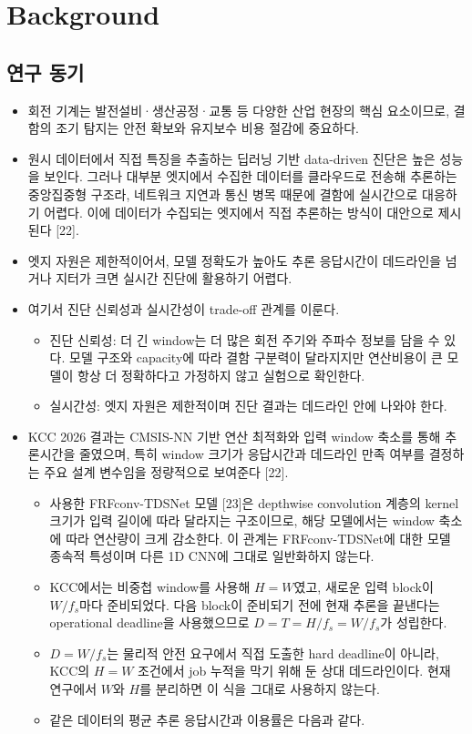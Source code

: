 \documentclass[10pt]{article}
\begin{document}
\section{Background}
\subsection{연구 동기}
\begin{itemize}
\item 회전 기계는 발전설비·생산공정·교통 등 다양한 산업 현장의 핵심 요소이므로, 결함의 조기 탐지는 안전 확보와 유지보수 비용 절감에 중요하다.
\item 원시 데이터에서 직접 특징을 추출하는 딥러닝 기반 data-driven 진단은 높은 성능을 보인다. 그러나 대부분 엣지에서 수집한 데이터를 클라우드로 전송해 추론하는 중앙집중형 구조라, 네트워크 지연과 통신 병목 때문에 결함에 실시간으로 대응하기 어렵다. 이에 데이터가 수집되는 엣지에서 직접 추론하는 방식이 대안으로 제시된다 [22].
\item 엣지 자원은 제한적이어서, 모델 정확도가 높아도 추론 응답시간이 데드라인을 넘거나 지터가 크면 실시간 진단에 활용하기 어렵다.
\item 여기서 진단 신뢰성과 실시간성이 trade-off 관계를 이룬다.
\begin{itemize}
\item 진단 신뢰성: 더 긴 window는 더 많은 회전 주기와 주파수 정보를 담을 수 있다. 모델 구조와 capacity에 따라 결함 구분력이 달라지지만 연산비용이 큰 모델이 항상 더 정확하다고 가정하지 않고 실험으로 확인한다.
\item 실시간성: 엣지 자원은 제한적이며 진단 결과는 데드라인 안에 나와야 한다.
\end{itemize}
\item KCC 2026 결과는 CMSIS-NN 기반 연산 최적화와 입력 window 축소를 통해 추론시간을 줄였으며, 특히 window 크기가 응답시간과 데드라인 만족 여부를 결정하는 주요 설계 변수임을 정량적으로 보여준다 [22].
\begin{itemize}
\item 사용한 FRFconv-TDSNet 모델 [23]은 depthwise convolution 계층의 kernel 크기가 입력 길이에 따라 달라지는 구조이므로, 해당 모델에서는 window 축소에 따라 연산량이 크게 감소한다. 이 관계는 FRFconv-TDSNet에 대한 모델 종속적 특성이며 다른 1D CNN에 그대로 일반화하지 않는다.
\item KCC에서는 비중첩 window를 사용해 $H=W$였고, 새로운 입력 block이 $W/f_s$마다 준비되었다. 다음 block이 준비되기 전에 현재 추론을 끝낸다는 operational deadline을 사용했으므로 $D=T=H/f_s=W/f_s$가 성립한다.
\item $D=W/f_s$는 물리적 안전 요구에서 직접 도출한 hard deadline이 아니라, KCC의 $H=W$ 조건에서 job 누적을 막기 위해 둔 상대 데드라인이다. 현재 연구에서 $W$와 $H$를 분리하면 이 식을 그대로 사용하지 않는다.
\item 같은 데이터의 평균 추론 응답시간과 이용률은 다음과 같다.
\end{itemize}
\end{itemize}
\end{document}
